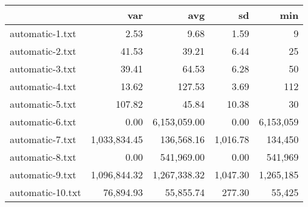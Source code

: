 \begin{tabular}{lrrrr}
  \toprule  & var & avg & sd & min \\ 
  \midrule automatic-1.txt & 2.53 & 9.68 & 1.59 & 9 \\ 
  automatic-2.txt & 41.53 & 39.21 & 6.44 & 25 \\ 
  automatic-3.txt & 39.41 & 64.53 & 6.28 & 50 \\ 
  automatic-4.txt & 13.62 & 127.53 & 3.69 & 112 \\ 
  automatic-5.txt & 107.82 & 45.84 & 10.38 & 30 \\ 
  automatic-6.txt & 0.00 & 6,153,059.00 & 0.00 & 6,153,059 \\ 
  automatic-7.txt & 1,033,834.45 & 136,568.16 & 1,016.78 & 134,450 \\ 
  automatic-8.txt & 0.00 & 541,969.00 & 0.00 & 541,969 \\ 
  automatic-9.txt & 1,096,844.32 & 1,267,338.32 & 1,047.30 & 1,265,185 \\ 
  automatic-10.txt & 76,894.93 & 55,855.74 & 277.30 & 55,425 \\ 
   \bottomrule \end{tabular}
